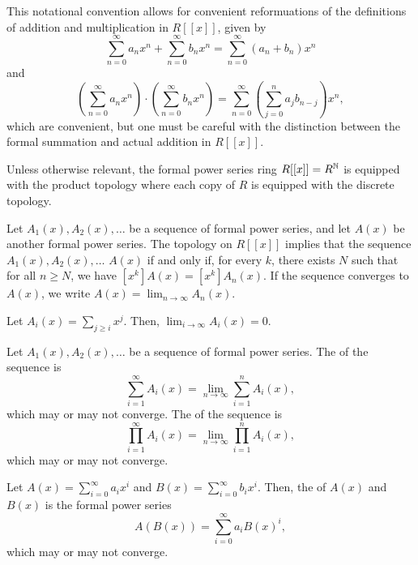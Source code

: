 This notational convention allows for convenient reformuations of the definitions of addition and multiplication in \(R[[x]]\), given by
\begin{equation*}
    \sum_{n=0}^\infty a_n x^n + \sum_{n=0}^\infty b_n x^n = \sum_{n=0}^\infty (a_n + b_n) x^n
\end{equation*}
and
\begin{equation*}
    \left( \sum_{n=0}^\infty a_n x^n \right) \cdot \left( \sum_{n=0}^\infty b_n x^n \right) = \sum_{n=0}^\infty \left( \sum_{j=0}^n a_j b_{n-j} \right) x^n,
\end{equation*}
which are convenient, but one must be careful with the distinction between the formal summation and actual addition in \(R[[x]]\).

Unless otherwise relevant, the formal power series ring \(R[[x]] = R^{\mathbb{N}}\) is equipped with the product topology where each copy of \(R\) is equipped with the discrete topology.

Let \(A_1(x), A_2(x), \dots\) be a sequence of formal power series,
and let \(A(x)\) be another formal power series.
The topology on \(R[[x]]\) implies that
the sequence \(A_1(x), A_2(x), \dots\)  \(A(x)\)
if and only if,
for every \(k\),
there exists \(N\) such that
for all \(n \geq N\),
we have \([x^k] A(x) = [x^k] A_n(x)\).
If the sequence converges to \(A(x)\),
we write \(A(x) = \lim_{n \to \infty} A_n(x)\).

\begin{example}
    Let \(A_i(x) = \sum_{j \geq i} x^j\).
    Then, \(\lim_{i \to \infty} A_i(x) = 0\).
\end{example}

Let \(A_1(x), A_2(x), \dots\) be a sequence of formal power series.
The  of the sequence is
\begin{equation}
    \sum_{i=1}^\infty A_i(x) = \lim_{n \to \infty} \sum_{i=1}^n A_i(x),
\end{equation}
which may or may not converge.
The  of the sequence is
\begin{equation}
    \prod_{i=1}^\infty A_i(x) = \lim_{n \to \infty} \prod_{i=1}^n A_i(x),
\end{equation}
which may or may not converge.

Let \(A(x) = \sum_{i=0}^\infty a_i x^i\) and \(B(x) = \sum_{i=0}^\infty b_i x^i\).
Then, the  of \(A(x)\) and \(B(x)\) is the formal power series
\begin{equation}
    A(B(x)) = \sum_{i=0}^\infty a_i B(x)^i,
\end{equation}
which may or may not converge.

